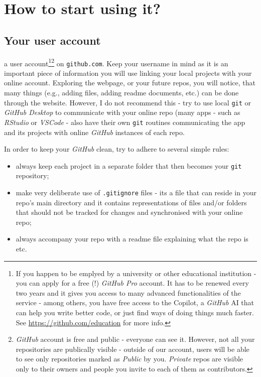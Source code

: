 \documentclass{tufte-handout}
\begin{document}
\section{How to start using it?}
\subsection{Your user account}

 a user account\footnote{If you happen to be emplyed by a university or other educational institution - you can apply for a free (!) \textit{GitHub Pro} account. It has to be renewed every two years and it gives you access to many advanced functionalities of the service - among others, you have free access to the Copilot, a \textit{GitHub} AI that can help you write better code, or just find ways of doing things much faster. See  \url{https://github.com/education} for more info.}\footnote{\textit{GitHub} account is free and public - everyone can see it. However, not all your repositories are publically visible - outside of our account, users will be able to see only repositories marked as \textit{Public} by you. \textit{Private} repos are visible only to their owners and people you invite to each of them as contributors.} on \texttt{github.com}. Keep your username in mind as it is an important piece of information you will use linking your local projects with your online account. Exploring the webpage, or your future repos, you will notice, that many things (e.g., adding files, adding readme documents, etc.) can be done through the website. However, I do not recommend this - try to use local \texttt{git} or \textit{GitHub Desktop} to communicate with your online repo (many apps - such as \textit{RStudio} or \textit{VSCode} - also have their own \texttt{git} routines communicating the app and its projects with online \textit{GitHub} instances of each repo.

In order to keep your \textit{GitHub} clean, try to adhere to several simple rules:
\begin{itemize}
    \item always keep each project in a separate folder that then becomes your \texttt{git} repository;
    \item make very deliberate use of \texttt{.gitignore} files - its a file that can reside in your repo's main directory and it contains representations of files and/or folders that should not be tracked for changes and synchronised with your online repo;
    \item always accompany your repo with a readme file explaining what the repo is etc.
\end{itemize}
\end{document}
